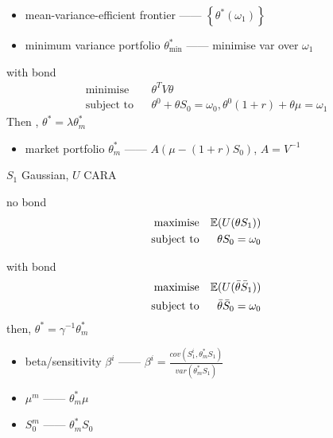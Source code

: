 \begin{itemize}
    \item mean-variance-efficient frontier ------ $\left\{ \theta^*(\omega_1) \right\}$
    \item minimum variance portfolio $\theta_\min^*$ ------ minimise var over $\omega_1$
\end{itemize}

\begin{example}
    with bond
    \begin{align*}
        \text{minimise} && \theta^T V\theta \\
        \text{subject to} && \theta^0 + \theta S_0 = \omega_0, \theta^0(1 + r) + \theta\mu = \omega_1
    \end{align*}
    Then , $\theta^* = \lambda\theta^*_m$
\end{example}

\begin{itemize}
    \item market portfolio $\theta^*_m$ ------ $A(\mu - (1 + r)S_0)$, $A = V^{-1}$
\end{itemize}

\begin{setting}
    $S_1$ Gaussian, $U$ CARA
\end{setting}

\begin{example}
    no bond
    \begin{align*}
        \text{maximise} && \mathbb{E}(U(\theta S_1))\\
        \text{subject to} && \theta S_0 = \omega_0
    \end{align*}
\end{example}

\begin{example}
    with bond
    \begin{align*}
        \text{maximise} && \mathbb{E}(U(\bar\theta \bar S_1))\\
        \text{subject to} && \bar\theta \bar S_0 = \omega_0
    \end{align*}
    then, $\theta^* = \gamma^{-1}\theta^*_m$
\end{example}

\begin{itemize}
    \item beta/sensitivity $\beta^i$ ------ $\beta^i = \frac{cov(S^i_1, \theta_m^* S_1)}{var(\theta_m^* S_1)}$
    \item $\mu^m$ ------ $\theta_m^* \mu$
    \item $S_0^m$ ------ $\theta_m^* S_0$
\end{itemize}

